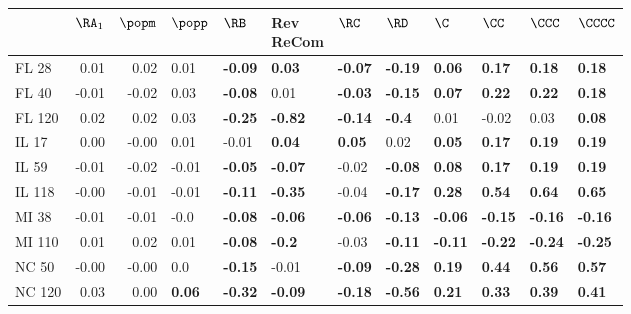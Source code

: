 \begin{tabular}{lrrlllllllll}
\toprule
{} &  $\RA_1$ &  $\popm$ &        $\popp$ &           $\RB$ & \makecell{Rev \\ ReCom} &           $\RC$ &           $\RD$ &            $\C$ &           $\CC$ &          $\CCC$ &         $\CCCC$ \\
\midrule
FL 28   &     0.01 &     0.02 &           0.01 &  \textbf{-0.09} &           \textbf{0.03} &  \textbf{-0.07} &  \textbf{-0.19} &   \textbf{0.06} &   \textbf{0.17} &   \textbf{0.18} &   \textbf{0.18} \\
FL 40   &    -0.01 &    -0.02 &           0.03 &  \textbf{-0.08} &                    0.01 &  \textbf{-0.03} &  \textbf{-0.15} &   \textbf{0.07} &   \textbf{0.22} &   \textbf{0.22} &   \textbf{0.18} \\
FL 120  &     0.02 &     0.02 &           0.03 &  \textbf{-0.25} &          \textbf{-0.82} &  \textbf{-0.14} &   \textbf{-0.4} &            0.01 &           -0.02 &            0.03 &   \textbf{0.08} \\
IL 17   &     0.00 &    -0.00 &           0.01 &           -0.01 &           \textbf{0.04} &   \textbf{0.05} &            0.02 &   \textbf{0.05} &   \textbf{0.17} &   \textbf{0.19} &   \textbf{0.19} \\
IL 59   &    -0.01 &    -0.02 &          -0.01 &  \textbf{-0.05} &          \textbf{-0.07} &           -0.02 &  \textbf{-0.08} &   \textbf{0.08} &   \textbf{0.17} &   \textbf{0.19} &   \textbf{0.19} \\
IL 118  &    -0.00 &    -0.01 &          -0.01 &  \textbf{-0.11} &          \textbf{-0.35} &           -0.04 &  \textbf{-0.17} &   \textbf{0.28} &   \textbf{0.54} &   \textbf{0.64} &   \textbf{0.65} \\
MI 38   &    -0.01 &    -0.01 &           -0.0 &  \textbf{-0.08} &          \textbf{-0.06} &  \textbf{-0.06} &  \textbf{-0.13} &  \textbf{-0.06} &  \textbf{-0.15} &  \textbf{-0.16} &  \textbf{-0.16} \\
MI 110  &     0.01 &     0.02 &           0.01 &  \textbf{-0.08} &           \textbf{-0.2} &           -0.03 &  \textbf{-0.11} &  \textbf{-0.11} &  \textbf{-0.22} &  \textbf{-0.24} &  \textbf{-0.25} \\
NC 50   &    -0.00 &    -0.00 &            0.0 &  \textbf{-0.15} &                   -0.01 &  \textbf{-0.09} &  \textbf{-0.28} &   \textbf{0.19} &   \textbf{0.44} &   \textbf{0.56} &   \textbf{0.57} \\
NC 120  &     0.03 &     0.00 &  \textbf{0.06} &  \textbf{-0.32} &          \textbf{-0.09} &  \textbf{-0.18} &  \textbf{-0.56} &   \textbf{0.21} &   \textbf{0.33} &   \textbf{0.39} &   \textbf{0.41} \\

\end{tabular}
